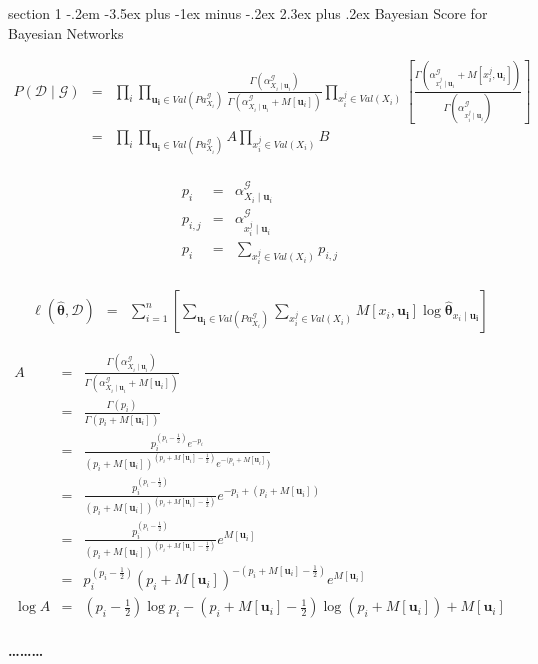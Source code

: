 \documentclass[12pt]{article}
\makeatletter
\newenvironment{problem}{\@startsection
       {section}
       {1}
       {-.2em}
       {-3.5ex plus -1ex minus -.2ex}
       {2.3ex plus .2ex}
       {\pagebreak[3]%
       \large\bf\noindent{Problem }
       }
       }
       {%
       \begin{center}\large\bf \ldots\ldots\ldots\end{center}}
\makeatother
\begin{document}
\begin{problem}{Bayesian Score for Bayesian Networks}

\begin{eqnarray*}
P( \mathcal{D} \mid \mathcal{G}) & = & 
\prod_i \prod _{\mathbf{u_{i}} \in Val(Pa^{\mathcal{G}}_{X_{i}})} 
\frac{\Gamma(\alpha^{\mathcal{G}}_{X_{i}\mid \mathbf{u}_{i}})}{\Gamma(\alpha^{\mathcal{G}}_{X_{i}\mid \mathbf{u}_{i}} + M[ \mathbf{u}_{i}])} 
\prod_{x_{i}^{j} \in Val(X_{i})} 
\left[ \frac{\Gamma(\alpha^{\mathcal{G}}_{x_{i}^{j}\mid \mathbf{u}_{i}} + M[ x_{i}^{j},\mathbf{u}_{i}])}{\Gamma(\alpha^{\mathcal{G}}_{x_{i}^{j}\mid \mathbf{u}_{i}} )} \right]\\
& = & 
\prod_i \prod _{\mathbf{u_{i}} \in Val(Pa^{\mathcal{G}}_{X_{i}})} 
A
\prod_{x_{i}^{j} \in Val(X_{i})} 
B\\
\end{eqnarray*}

\begin{eqnarray*}
p_{i} & = & \alpha^{\mathcal{G}}_{X_{i}\mid \mathbf{u}_{i}}\\
p_{i,j} & = & \alpha^{\mathcal{G}}_{x_{i}^{j}\mid \mathbf{u}_{i}}   \\
p_{i} & = & \sum_{x_{i}^{j} \in Val(X_{i})} p_{i,j}\\
\end{eqnarray*}


\begin{eqnarray*}
\ell(\hat{\mathbf{\theta}},\mathcal{D}) & = & 
	\sum^{n}_{i=1} \left[ 
	\sum_{\mathbf{u_{i}} \in Val(Pa^{\mathcal{G}}_{X_{i}})}  
	\sum_{x_{i}^{j} \in Val(X_{i})}  
	M[x_{i},\mathbf{u_{i}}] \log \hat{\mathbf{\theta}}_{x_{i} \mid \mathbf{u_{i}}} \right]
\end{eqnarray*}


\begin{eqnarray*}
A & = & \frac{\Gamma(\alpha^{\mathcal{G}}_{X_{i}\mid \mathbf{u}_{i}})}{\Gamma(\alpha^{\mathcal{G}}_{X_{i}\mid \mathbf{u}_{i}} + M[ \mathbf{u}_{i}])} \\
& = & \frac{\Gamma(p_{i})}{\Gamma(p_{i} + M[ \mathbf{u}_{i}])} \\
& = & \frac{p_{i}^{(p_{i}-\frac{1}{2})} e^{-p_{i}}}{(p_{i} + M[ \mathbf{u}_{i}])^{(p_{i} + M[ \mathbf{u}_{i}] - \frac{1}{2})}e^{-(p_{i} + M[ \mathbf{u}_{i}]})} \\
& = & \frac{p_{i}^{(p_{i}-\frac{1}{2})} }{(p_{i} + M[ \mathbf{u}_{i}])^{(p_{i} + M[ \mathbf{u}_{i}] - \frac{1}{2})}} e^{-p_{i}+(p_{i} + M[ \mathbf{u}_{i}])} \\
& = & \frac{p_{i}^{(p_{i}-\frac{1}{2})} }{(p_{i} + M[ \mathbf{u}_{i}])^{(p_{i} + M[ \mathbf{u}_{i}] - \frac{1}{2})}} e^{ M[ \mathbf{u}_{i}]} \\
& = & p_{i}^{(p_{i}-\frac{1}{2})} 
	(p_{i} + M[ \mathbf{u}_{i}])^{-(p_{i} + M[ \mathbf{u}_{i}] - \frac{1}{2})} 
	e^{ M[ \mathbf{u}_{i}]} \\
\log A & = & (p_{i}-\frac{1}{2})\log p_{i}
	-(p_{i} + M[ \mathbf{u}_{i}] - \frac{1}{2})  \log (p_{i} + M[ \mathbf{u}_{i}])
	+ M[ \mathbf{u}_{i}] \\
\end{eqnarray*}


\end{problem}
\end{document}
